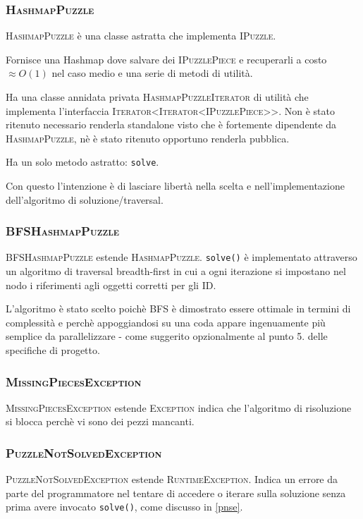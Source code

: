 \documentclass[a4paper]{article}
\newcommand{\Classname}[1]{\textsc{#1}}
\newcommand{\Ifacename}[1]{\textsc{#1}}
\newcommand{\Methodname}[1]{\texttt{#1}}
\begin{document}
\subsubsection{\Classname{HashmapPuzzle}}
\Classname{HashmapPuzzle} \`e una classe astratta che implementa \Ifacename{IPuzzle}.

Fornisce una Hashmap dove salvare dei \Ifacename{IPuzzlePiece}  e recuperarli a costo $\approx O(1)$ nel caso medio e una serie di metodi di utilit\`a.

Ha una classe annidata privata \Classname{HashmapPuzzleIterator} di utilit\`a che implementa l'interfaccia \Ifacename{Iterator<Iterator<IPuzzlePiece>>}. Non \`e stato ritenuto necessario renderla standalone visto che \`e fortemente dipendente da \Classname{HashmapPuzzle}, n\`e \`e stato ritenuto opportuno renderla pubblica.

Ha un solo metodo astratto: \Methodname{solve}.

Con questo l'intenzione \`e di lasciare libert\`a nella scelta e nell'implementazione dell'algoritmo di soluzione/traversal.

\subsubsection{\Classname{BFSHashmapPuzzle}}
\Classname{BFSHashmapPuzzle} estende \Classname{HashmapPuzzle}.
\Methodname{solve()} \`e implementato attraverso un algoritmo di traversal breadth-first \cite{cormen2001introduction} in cui a ogni iterazione si impostano nel nodo i riferimenti agli oggetti corretti per gli ID.

L'algoritmo \`e stato scelto poich\`e BFS \`e dimostrato essere ottimale in termini di complessit\`a e perch\`e appoggiandosi su una coda appare ingenuamente pi\`u semplice da parallelizzare - come suggerito opzionalmente al punto 5. delle specifiche di progetto\cite{prspec}.
\subsubsection{\Classname{MissingPiecesException}}
\Classname{MissingPiecesException} estende \Classname{Exception} indica che l'algoritmo di risoluzione si blocca perch\`e vi sono dei pezzi mancanti.

\subsubsection{\Classname{PuzzleNotSolvedException}}
\Classname{PuzzleNotSolvedException} estende \Classname{RuntimeException}.
Indica un errore da parte del programmatore nel tentare di accedere o iterare sulla soluzione senza prima avere invocato \Methodname{solve()}, come discusso in \ref{pnse}.
\end{document}
